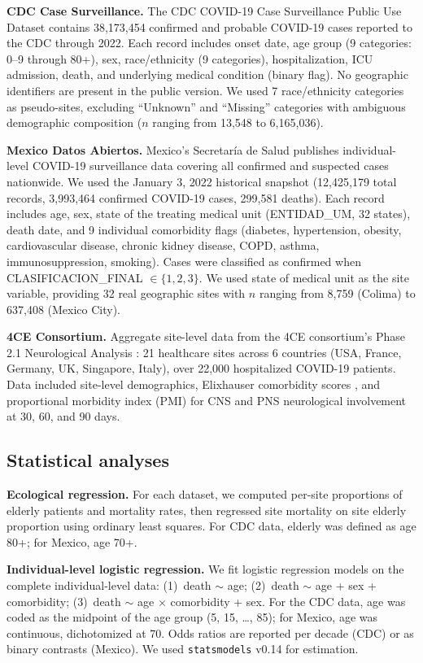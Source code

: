 \documentclass[11pt]{article}
\begin{document}
\textbf{CDC Case Surveillance.}  The CDC COVID-19 Case Surveillance Public
Use Dataset contains 38,173,454 confirmed and probable COVID-19 cases reported
to the CDC through 2022.  Each record includes onset date, age group (9
categories: 0--9 through 80+), sex, race/ethnicity (9 categories),
hospitalization, ICU admission, death, and underlying medical condition (binary
flag).  No geographic identifiers are present in the public version.  We used
7 race/ethnicity categories as pseudo-sites, excluding ``Unknown'' and
``Missing'' categories with ambiguous demographic composition ($n$ ranging
from 13,548 to 6,165,036).

\textbf{Mexico Datos Abiertos.}  Mexico's Secretar\'{i}a de Salud publishes
individual-level COVID-19 surveillance data covering all confirmed and
suspected cases nationwide.  We used the January 3, 2022 historical snapshot
(12,425,179 total records, 3,993,464 confirmed COVID-19 cases, 299,581
deaths).  Each record includes age, sex, state of the treating medical unit
(ENTIDAD\_UM, 32 states), death date, and 9 individual comorbidity flags
(diabetes, hypertension, obesity, cardiovascular disease, chronic kidney
disease, COPD, asthma, immunosuppression, smoking).  Cases were classified as
confirmed when CLASIFICACION\_FINAL $\in \{1, 2, 3\}$.  We used state of
medical unit as the site variable, providing 32 real geographic sites with
$n$ ranging from 8,759 (Colima) to 637,408 (Mexico City).

\textbf{4CE Consortium.}  Aggregate site-level data from the 4CE consortium's
Phase 2.1 Neurological Analysis \cite{four_ce_neuro2021}: 21 healthcare sites
across 6 countries (USA, France, Germany, UK, Singapore, Italy), over 22,000
hospitalized COVID-19 patients.  Data included site-level demographics,
Elixhauser comorbidity scores \cite{elixhauser1998}, and proportional morbidity
index (PMI) for CNS and PNS neurological involvement at 30, 60, and 90 days.

\subsection{Statistical analyses}

\textbf{Ecological regression.}  For each dataset, we computed per-site
proportions of elderly patients and mortality rates, then regressed site
mortality on site elderly proportion using ordinary least squares.  For CDC
data, elderly was defined as age 80+; for Mexico, age 70+.

\textbf{Individual-level logistic regression.}  We fit logistic regression
models on the complete individual-level data: (1)~death $\sim$ age;
(2)~death $\sim$ age + sex + comorbidity; (3)~death $\sim$ age $\times$
comorbidity + sex.  For the CDC data, age was coded as the midpoint of the
age group (5, 15, \ldots, 85); for Mexico, age was continuous, dichotomized
at 70.  Odds ratios are reported per decade (CDC) or as binary contrasts
(Mexico).  We used \texttt{statsmodels} v0.14 for estimation.
\end{document}
